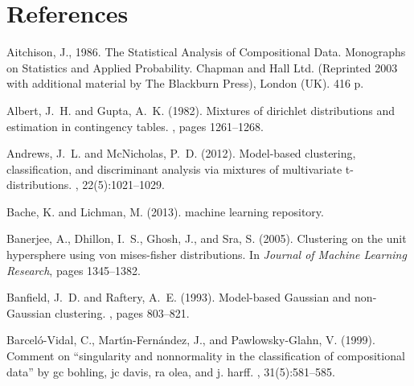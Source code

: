 \documentclass[10pt, a4paper]{article}
\begin{document}
\section*{References}

\begin{thebibliography}{00}

Aitchison, J., 1986. The Statistical Analysis of Compositional Data. Monographs on Statistics and
Applied Probability. Chapman and Hall Ltd. (Reprinted 2003 with additional material by The
Blackburn Press), London (UK). 416 p.

Albert, J.~H. and Gupta, A.~K. (1982).
\newblock Mixtures of dirichlet distributions and estimation in contingency
  tables.
, pages 1261--1268.

Andrews, J.~L. and McNicholas, P.~D. (2012).
\newblock Model-based clustering, classification, and discriminant analysis via
  mixtures of multivariate t-distributions.
, 22(5):1021--1029.

Bache, K. and Lichman, M. (2013).
 machine learning repository.

Banerjee, A., Dhillon, I.~S., Ghosh, J., and Sra, S. (2005).
\newblock Clustering on the unit hypersphere using von mises-fisher
  distributions.
\newblock In {\em Journal of Machine Learning Research}, pages 1345--1382.

Banfield, J.~D. and Raftery, A.~E. (1993).
\newblock Model-based Gaussian and non-Gaussian clustering.
, pages 803--821.

Barcel{\'o}-Vidal, C., Mart{\'\i}n-Fern{\'a}ndez, J., and Pawlowsky-Glahn, V.
  (1999).
\newblock Comment on ``singularity and nonnormality in the classification of
  compositional data'' by gc bohling, jc davis, ra olea, and j. harff.
, 31(5):581--585.



\end{thebibliography}
\end{document}
